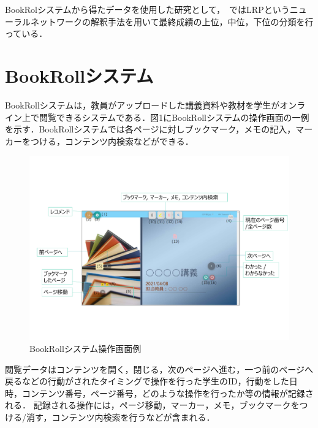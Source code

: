 \documentclass[platex,dvipdfmx,a4paper,twocolumn,base=10pt,jbase=10pt,ja=standard]{bxjsarticle}
\begin{document}
BookRolシステムから得たデータを使用した研究として，~\cite{BR12020}ではLRPというニューラルネットワークの解釈手法を用いて最終成績の上位，中位，下位の分類を行っている．



\section{BookRollシステム}
\label{sec:BookRoll}

BookRollシステムは，教員がアップロードした講義資料や教材を学生がオンライン上で閲覧できるシステムである．図1にBookRollシステムの操作画面の一例を示す．BookRollシステムでは各ページに対しブックマーク，メモの記入，マーカーをつける，コンテンツ内検索などができる．

\vspace{-10mm}

\begin{figure}[h]
  \centering
  \includegraphics[scale = 0.3]{BookRoll.pdf}
  \vspace{-15mm}
  \caption{BookRollシステム操作画面例}
  \label{fig:BookRollシステム操作画面例}
\end{figure}


閲覧データはコンテンツを開く，閉じる，次のページへ進む，一つ前のページへ戻るなどの行動がされたタイミングで操作を行った学生のID，行動をした日時，コンテンツ番号，ページ番号，どのような操作を行ったか等の情報が記録される．
記録される操作には，ページ移動，マーカー，メモ，ブックマークをつける/消す，コンテンツ内検索を行うなどが含まれる．
\end{document}
